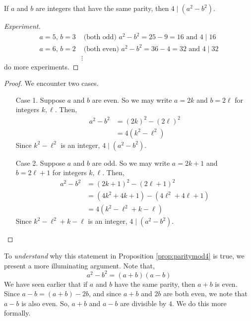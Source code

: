 \begin{proposition}\label{prop:paritymod4}
If $a$ and $b$ are integers that have the same parity, then $4\mid (a^2 - b^2)$. 
\end{proposition}
\begin{proof}[Experiment]
\renewcommand{\qed}{}
\begin{align*}
a = 5,\, b = 3 & \text{ (both odd) } a^2 - b^2 = 25 - 9 = 16 \text{ and } 4\mid 16\\[0.5em]
a = 6,\, b = 2 & \text{ (both even) } a^2 - b^2 = 36 - 4 = 32 \text{ and } 4\mid 32\\[0.5em]
&\vdots
\end{align*}
do more experiments.
\end{proof}
\begin{proof}
We encounter two cases. 
\begin{itemize}[leftmargin=4em]
\item[Case 1.] Suppose $a$ and $b$ are even. So we may write $a = 2k$ and $b = 2\ell$ for integers $k,\ell$. Then,
\begin{align*}
a^2 - b^2 &= (2k)^2 - (2\ell)^2\\[0.5em]
 &= 4(k^2 - \ell^2)
\end{align*}
Since $k^2 - \ell^2$ is an integer, $4\mid (a^2 - b^2)$.
\item[Case 2.] Suppose $a$ and $b$ are odd. So we may write $a = 2k + 1$ and $b = 2\ell + 1$ for integers $k,\ell$. Then,
\begin{align*}
a^2 - b^2 &= (2k + 1)^2 - (2\ell + 1)^2\\[0.5em]
 &= (4k^2 + 4k + 1) - (4\ell^2 + 4\ell + 1)\\[0.5em]
 &= 4(k^2 - \ell^2 + k - \ell)
\end{align*}
Since $k^2 - \ell^2 + k - \ell$ is an integer, $4\mid (a^2 - b^2)$.
\end{itemize}
\vspace*{-\baselineskip}
\end{proof}

\vspace*{1em}

\begin{remark}
To \emph{understand} why this statement in Proposition \ref{prop:paritymod4} is true, we present a more illuminating argument. Note that,
\[a^2 - b^2 = (a+b)(a-b)\]
We have seen earlier that if $a$ and $b$ have the same parity, then $a+b$ is even. Since $a - b = (a + b) - 2b$, and since $a+b$ and $2b$ are both even, we note that $a - b$ is also even. So, $a+ b$ and $a - b$ are divisible by $4$. We do this more formally.
\end{remark}

